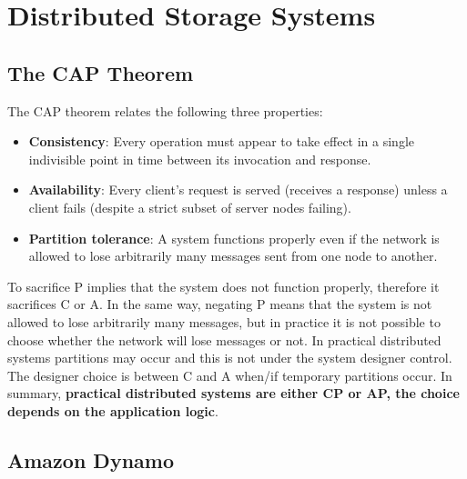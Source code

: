 \chapter{Distributed Storage Systems}

\section{The CAP Theorem}
	The CAP theorem relates the following three properties:
	\begin{itemize}
		\item \textbf{Consistency}: Every operation must appear to take effect in a single indivisible point in time between its invocation and response.
		\item \textbf{Availability}: Every client's request is served (receives a response) unless a client fails (despite a strict subset of server nodes failing).
		\item \textbf{Partition tolerance}: A system functions properly even if the network is allowed to lose arbitrarily many messages sent from one node to another.
	\end{itemize}
	To sacrifice P implies that the system does not function properly, therefore it sacrifices C or A. In the same way, negating P means that the system is not allowed to lose arbitrarily many messages, but in practice it is not possible to choose whether the network will lose messages or not.\newline
	In practical distributed systems partitions may occur and this is not under the system designer control. The designer choice is between C and A when/if temporary partitions occur.\newline
	In summary, \textbf{practical distributed systems are either CP or AP, the choice depends on the application logic}.

\section{Amazon Dynamo}
